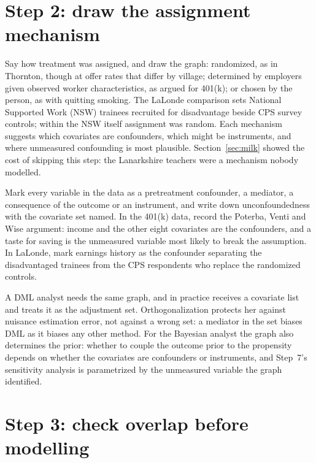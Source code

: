 \section{Step 2: draw the assignment mechanism}

Say how treatment was assigned, and draw the graph: randomized, as in Thornton, though at offer rates that differ by village; determined by employers given observed worker characteristics, as argued for 401(k); or chosen by the person, as with quitting smoking. The LaLonde comparison sets National Supported Work (NSW) trainees recruited for disadvantage beside CPS survey controls; within the NSW itself assignment was random. Each mechanism suggests which covariates are confounders, which might be instruments, and where unmeasured confounding is most plausible. Section~\ref{sec:milk} showed the cost of skipping this step: the Lanarkshire teachers were a mechanism nobody modelled.

Mark every variable in the data as a pretreatment confounder, a mediator, a consequence of the outcome or an instrument, and write down unconfoundedness with the covariate set named. In the 401(k) data, record the Poterba, Venti and Wise argument: income and the other eight covariates are the confounders, and a taste for saving is the unmeasured variable most likely to break the assumption. In LaLonde, mark earnings history as the confounder separating the disadvantaged trainees from the CPS respondents who replace the randomized controls.

A DML analyst needs the same graph, and in practice receives a covariate list and treats it as the adjustment set. Orthogonalization protects her against nuisance estimation error, not against a wrong set: a mediator in the set biases DML as it biases any other method. For the Bayesian analyst the graph also determines the prior: whether to couple the outcome prior to the propensity depends on whether the covariates are confounders or instruments, and Step~7's sensitivity analysis is parametrized by the unmeasured variable the graph identified.

\section{Step 3: check overlap before modelling}

